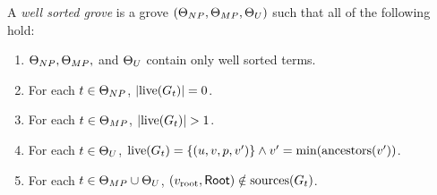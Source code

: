 \begin{definition}
  A \emph{well sorted grove} is a grove $(\Set[NP], \Set[MP], \Set[U])$ such that all of the following hold:
  \begin{enumerate}
    \item $\Set[NP], \Set[MP],$ and $\Set[U]$ contain only well sorted terms.
    \item For each $t \in \Set[NP]$, $\SizeOf{\live{G_t}} = 0$.
    \item For each $t \in \Set[MP]$, $\SizeOf{\live{G_t}} > 1$.
    \item For each $t \in \Set[U]$, $\live{G_t} = \SetOf{(u, v, p, v')} \land v' = \min{\ancestors{v'}}$.
    \item For each $t \in \Set[MP] \cup \Set[U]$, $(\rootVertex, \Root) \notin \sources{G_t}$.
  \end{enumerate}
\end{definition}


